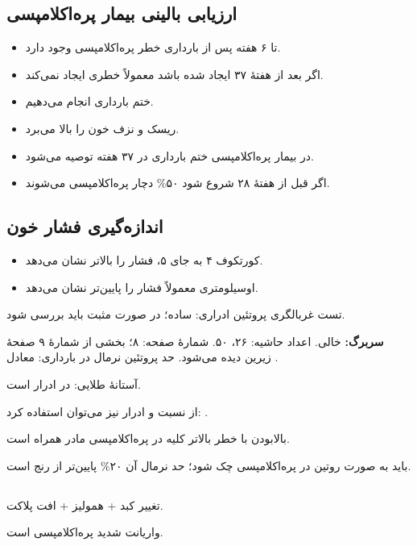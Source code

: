 \documentclass[12pt,a4paper]{article}
\begin{document}
\subsection*{ارزیابی بالینی بیمار پره‌اکلامپسی}
\begin{itemize}
\item تا ۶ هفته پس از بارداری خطر پره‌اکلامپسی وجود دارد.
\item اگر  بعد از هفتهٔ ۳۷ ایجاد شده باشد معمولاً خطری ایجاد نمی‌کند.
\item ختم بارداری انجام می‌دهیم.
\item {} ریسک  و نزف خون را بالا می‌برد.
\item در بیمار پره‌اکلامپسی ختم بارداری در ۳۷ هفته توصیه می‌شود.
\item اگر  قبل از هفتهٔ ۲۸ شروع شود ۵۰\% دچار پره‌اکلامپسی می‌شوند.
\end{itemize}
\subsection*{اندازه‌گیری فشار خون}
\begin{itemize}
\item کورتکوف ۴ به جای ۵، فشار را \lr{10 mm} بالاتر نشان می‌دهد.
\item اوسیلومتری معمولاً فشار را پایین‌تر نشان می‌دهد.
\end{itemize}
تست غربالگری پروتئین ادراری:  ساده؛ در صورت مثبت باید بررسی شود.

\textbf{سربرگ:}  خالی. اعداد حاشیه: ۲۶، ۵۰. شمارهٔ صفحه: ۸؛ بخشی از شمارهٔ ۹ صفحهٔ زیرین دیده می‌شود.
حد پروتئین نرمال در بارداری:  معادل .

آستانهٔ طلایی:  در ادرار  است.

از نسبت  و  ادرار نیز می‌توان استفاده کرد: .

بالابودن  با خطر بالاتر کلیه در پره‌اکلامپسی مادر همراه است. 

 باید به صورت روتین در پره‌اکلامپسی چک شود؛ حد نرمال آن ۲۰\% پایین‌تر از رنج  است.
\subsection*{}
تغییر کبد + همولیز + افت پلاکت.

واریانت شدید پره‌اکلامپسی است.
\end{document}
